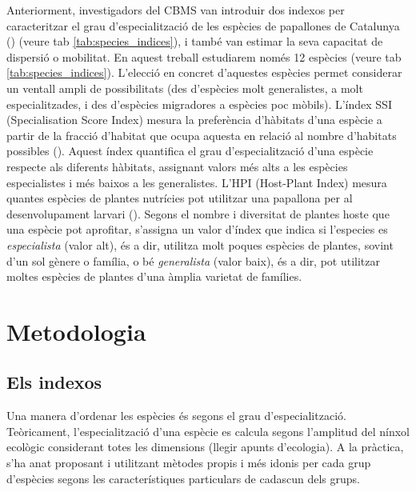 \documentclass{article}
\begin{document}
Anteriorment, investigadors del CBMS van introduir dos indexos per caracteritzar el grau d'especialitzaci\'o de les esp\`ecies de papallones de Catalunya (\cite{stefanescu2011-SSI,colom2022-HPI}) (veure tab \ref{tab:species_indices}), i tamb\'e van estimar la seva capacitat de dispersió o mobilitat. En aquest treball estudiarem nom\'es 12 esp\`ecies (veure tab \ref{tab:species_indices}). L'elecci\'o en concret d'aquestes esp\`ecies permet considerar un ventall ampli de possibilitats (des d'esp\`ecies molt generalistes, a molt especialitzades, i des d'esp\`ecies migradores a esp\`ecies poc m\`obils).  L'índex SSI (Specialisation Score Index) mesura la preferència d'hàbitats d'una esp\`ecie a partir de la fracci\'o d'habitat que ocupa aquesta en relaci\'o al nombre d'habitats possibles (\cite{julliard2006-SSI}). Aquest índex quantifica el grau d'especialització d'una espècie respecte als diferents hàbitats, assignant valors més alts a les espècies especialistes i més baixos a les generalistes. L’HPI (Host-Plant Index) mesura quantes espècies de plantes nutrícies pot utilitzar una papallona per al desenvolupament larvari (\cite{Middleton-WellingJoseph2020-HPI}). Segons el nombre i diversitat de plantes hoste que una espècie pot aprofitar, s’assigna un valor d’índex que indica si l'especies es \textit{especialista} (valor alt), \'es a dir, utilitza molt poques espècies de plantes, sovint d’un sol gènere o família, o b\'e \textit{generalista} (valor baix), \'es a dir, pot utilitzar moltes espècies de plantes d’una àmplia varietat de famílies. 
 
\section{Metodologia}
\subsection{Els indexos}
Una manera d'ordenar les espècies és segons el grau d'especialització. Teòricament, l'especialització d'una espècie es calcula segons l'amplitud del nínxol ecològic considerant totes les dimensions (llegir apunts d'ecologia). A la pràctica, s'ha anat proposant i utilitzant mètodes propis i més idonis per cada grup d'espècies segons les característiques particulars de cadascun dels grups. 
\end{document}
